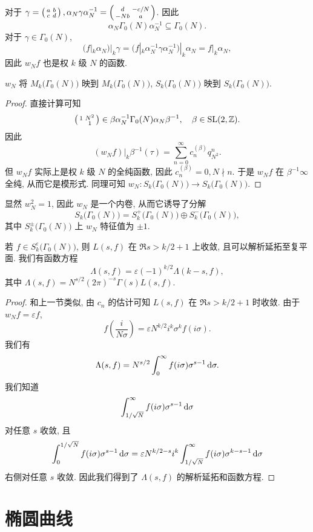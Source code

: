 对于 $\gamma=\left(\begin{smallmatrix}a & b \\ c & d\end{smallmatrix}\right), \alpha_N\gamma\alpha_N^{-1}=\left(\begin{smallmatrix}d & -c/N \\ -Nb & a\end{smallmatrix}\right)$. 因此
  \[\alpha_N\Gamma_0(N)\alpha_N^{-1}\subseteq \Gamma_0(N).\]
对于 $\gamma\in\Gamma_0(N)$,
  \[(f|_k\alpha_N)|_k\gamma=(f|_k\alpha_N^{-1}\gamma\alpha_N^{-1})|_k\alpha_N=f|_k\alpha_N,\]
因此 $w_N f$ 也是权 $k$ 级 $N$ 的函数.
\begin{proposition}{}{}
$w_N$ 将 $M_k\bigl(\Gamma_0(N)\bigr)$ 映到 $M_k\bigl(\Gamma_0(N)\bigr)$, $S_k\bigl(\Gamma_0(N)\bigr)$ 映到 $S_k\bigl(\Gamma_0(N)\bigr)$.
\end{proposition}
\begin{proof}
直接计算可知
  \[\left(\begin{smallmatrix}1 & N^2 \\  & 1\end{smallmatrix}\right)\in \beta\alpha_N^{-1}\Gamma_0(N)\alpha_N\beta^{-1},\quad \beta\in{\mathrm{SL}}(2,{\mathbb{Z}}).\]
因此
  \[(w_Nf)|_k\beta^{-1}(\tau)=\sum_{n=0}^\infty c_n^{(\beta)} q_{N^2}^n.\]
但 $w_Nf$ 实际上是权 $k$ 级 $N$ 的全纯函数, 因此 $c_n^{(\beta)}=0,N\nmid n$. 于是 $w_Nf$ 在 $\beta^{-1}\infty$ 全纯, 从而它是模形式. 同理可知 $w_N:S_k\bigl(\Gamma_0(N)\bigr)\to S_k\bigl(\Gamma_0(N)\bigr)$.
\end{proof}

显然 $w_N^2=1$, 因此 $w_N$ 是一个内卷, 从而它诱导了分解
  \[S_k\bigl(\Gamma_0(N)\bigr)=S_k^+\bigl(\Gamma_0(N)\bigr)\oplus S_k^-\bigl(\Gamma_0(N)\bigr),\]
其中 $S_k^\pm\bigl(\Gamma_0(N)\bigr)$ 上 $w_N$ 特征值为 $\pm 1$.

\begin{theorem}{}{}
若 $f\in S_k^\varepsilon\bigl(\Gamma_0(N)\bigr)$, 则 $L(s,f)$ 在 $\Re s>k/2+1$ 上收敛, 且可以解析延拓至复平面. 我们有函数方程
  \[\Lambda(s,f)=\varepsilon(-1)^{k/2}\Lambda(k-s,f),\]
其中 $\Lambda(s,f)=N^{s/2}(2\pi)^{-s}\Gamma(s)L(s,f).$
\end{theorem}
\begin{proof}
和上一节类似, 由 $c_n$ 的估计可知 $L(s,f)$ 在 $\Re s>k/2+1$ 时收敛. 由于 $w_Nf=\varepsilon f$,
  \[f\left(\frac{i}{N\sigma}\right)=\varepsilon N^{k/2} i^k\sigma^kf(i\sigma).\]
我们有
  \[\Lambda(s,f)=N^{s/2}\int_0^\infty f(i\sigma)\sigma^{s-1}\mathop{}\!\mathrm{d} \sigma.\]
我们知道
  \[\int_{1/\sqrt{N}}^\infty f(i\sigma)\sigma^{s-1}\mathop{}\!\mathrm{d} \sigma\]
对任意 $s$ 收敛, 且
  \[\int_0^{1/\sqrt{N}} f(i\sigma)\sigma^{s-1}\mathop{}\!\mathrm{d} \sigma=\varepsilon N^{k/2-s}i^k\int_{1/\sqrt{N}}^\infty f(i\sigma)\sigma^{k-s-1}\mathop{}\!\mathrm{d} \sigma\]
右侧对任意 $s$ 收敛. 因此我们得到了 $\Lambda(s,f)$ 的解析延拓和函数方程.
\end{proof}



\section{椭圆曲线}
\label{sec:elliptic curves}


